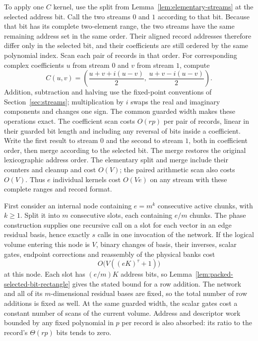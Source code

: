 To apply one \(C\) kernel, use the split from
Lemma~\ref{lem:elementary-streams} at the selected address bit.
Call the two streams \(0\) and \(1\) according to that bit.
Because that bit has its complete two-element range, the two streams
have the same remaining address set in the same order.  Their aligned
record addresses therefore differ only in the selected bit, and their
coefficients are still ordered by the same polynomial index.  Scan
each pair of records in that order.  For corresponding complex
coefficients \(u\) from stream \(0\) and \(v\) from stream \(1\), compute
\begin{equation}\label{eq:individual-C-pair}
 C(u,v)=
 \left(\frac{u+v+i(u-v)}2,\,
       \frac{u+v-i(u-v)}2\right).
\end{equation}
Addition, subtraction and halving use the fixed-point conventions of
Section~\ref{sec:streams}; multiplication by \(i\) swaps the real
and imaginary components and changes one sign.  The common guarded
width makes these operations exact.  The coefficient scan costs
\(O(rp)\) per pair of records, linear in their guarded bit length
and including any reversal of bits inside a coefficient.  Write the
first result to stream \(0\) and the second to stream \(1\), both in
coefficient order, then merge
according to the selected bit.  The merge restores the original
lexicographic address order.  The elementary split and merge include
their counters and cleanup and cost \(O(V)\); the paired arithmetic
scan also costs \(O(V)\).  Thus \(e\) individual kernels cost
\(O(Ve)\) on any stream with these complete ranges and record format.

First consider an internal node containing \(e=m^k\) consecutive
active chunks, with \(k\ge1\).  Split it into \(m\) consecutive slots,
each containing \(e/m\) chunks.
The phase construction supplies one recursive call on a slot for each
vector in an edge residual basis, hence exactly \(s\) calls in one
invocation of the network.  If the logical volume entering this node
is \(V\), binary changes of basis, their inverses, scalar gates,
endpoint corrections and reassembly of the physical banks cost
\[
 O\bigl(V((eK)^\tau+1)\bigr)
\]
at this node.  Each slot has \((e/m)K\) address bits, so
Lemma~\ref{lem:packed-selected-bit-rectangle} gives the stated bound for a row addition.  The
network and all of its \(m\)-dimensional residual bases are fixed,
so the total number of row additions is fixed as well.  At the same
guarded width, the scalar gates cost a constant
number of scans of the current volume.  Address and descriptor
work bounded by any fixed polynomial in \(p\) per record is also
absorbed: its ratio to the record's \(\Theta(rp)\) bits tends to zero.

